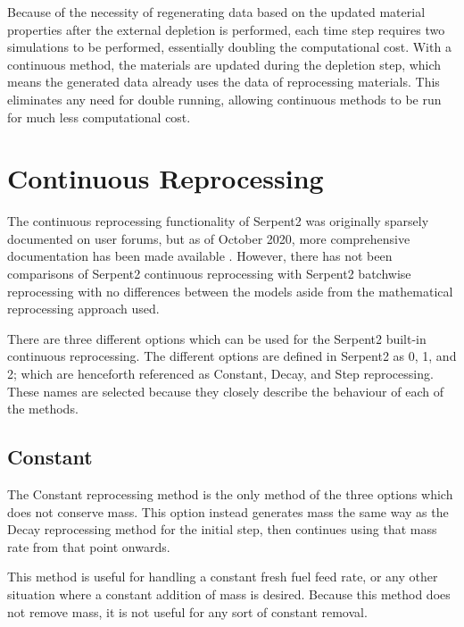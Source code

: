 Because of the necessity of regenerating data based on the updated material properties after the external depletion is performed, each time step requires two simulations to be performed, essentially doubling the computational cost. With a continuous method, the materials are updated during the depletion step, which means the generated data already uses the data of reprocessing materials. This eliminates any need for double running, allowing continuous methods to be run for much less computational cost.

\section{Continuous Reprocessing}

The continuous reprocessing functionality of Serpent2 was originally sparsely documented on user forums, but as of October 2020, more comprehensive documentation has been made available \cite{seifert_material_2020}.
However, there has not been comparisons of Serpent2 continuous reprocessing with Serpent2 batchwise reprocessing with no differences between the models aside from the mathematical reprocessing approach used.

There are three different options which can be used for the Serpent2 built-in continuous reprocessing. The different options are defined in Serpent2 as 0, 1, and 2; which are henceforth referenced as Constant, Decay, and Step reprocessing. These names are selected because they closely describe the behaviour of each of the methods.

\subsection{Constant}
The Constant reprocessing method is the only method of the three options which does not conserve mass. This option instead generates mass the same way as the Decay reprocessing method for the initial step, then continues using that mass rate from that point onwards.

This method is useful for handling a constant fresh fuel feed rate, or any other situation where a constant addition of mass is desired. Because this method does not remove mass, it is not useful for any sort of constant removal.

